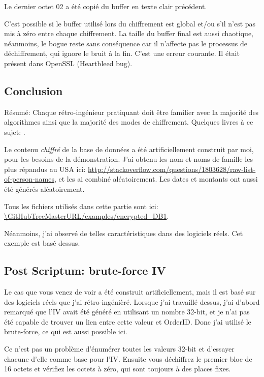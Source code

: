 Le dernier octet 02 a été copié du buffer en texte clair précédent.

C'est possible si le buffer utilisé lors du chiffrement est global et/ou s'il n'est
pas mis à zéro entre chaque chiffrement.
La taille du buffer final est aussi chaotique, néanmoins, le bogue reste sans conséquence
car il n'affecte pas le processus de déchiffrement, qui ignore le bruit à la fin.
C'est une erreur courante.
Il était présent dans OpenSSL (Heartbleed bug).

\subsection{Conclusion}

Résumé:
Chaque rétro-ingénieur pratiquant doit être familier avec la majorité des algorithmes
ainsi que la majorité des modes de chiffrement.
Quelques livres à ce sujet: .

Le contenu \emph{chiffré} de la base de données a été artificiellement construit
par moi, pour les besoins de la démonstration.
J'ai obtenu les nom et noms de famille les plus répandus au USA ici: \url{http://stackoverflow.com/questions/1803628/raw-list-of-person-names},
et les ai combiné aléatoirement.
Les dates et montants ont aussi été générés aléatoirement.

Tous les fichiers utilisés dans cette partie sont ici: \url{\GitHubTreeMasterURL/examples/encrypted_DB1}.

Néanmoins, j'ai observé de telles caractéristiques dans des logiciels réels.
Cet exemple est basé dessus.

\subsection{Post Scriptum: brute-force \ac{IV}}

Le cas que vous venez de voir a été construit artificiellement, mais il est basé
sur des logiciels réels que j'ai rétro-ingénièré.
Lorsque j'ai travaillé dessus, j'ai d'abord remarqué que l'\ac{IV} avait été généré
en utilisant un nombre 32-bit, et je n'ai pas été capable de trouver un lien entre
cette valeur et OrderID.
Donc j'ai utilisé le brute-force, ce qui est aussi possible ici.

Ce n'est pas un problème d'énumérer toutes les valeurs 32-bit et d'essayer chacune
d'elle comme base pour l'\ac{IV}.
Ensuite vous déchiffrez le premier bloc de 16 octets et vérifiez les octets à zéro,
qui sont toujours à des places fixes.
